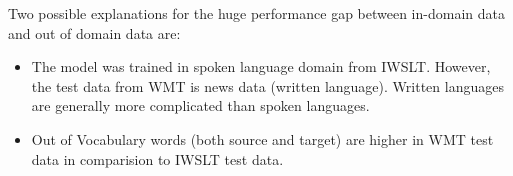 


Two possible explanations for the huge performance gap between in-domain data and out of domain data are:
\begin{itemize}
	\item The model was trained in spoken language domain from IWSLT. However, the test data from WMT is news data (written language). Written languages are generally more complicated than spoken languages.
	\item Out of Vocabulary words (both source and target) are higher in WMT test data in comparision to IWSLT test data.
\end{itemize}

